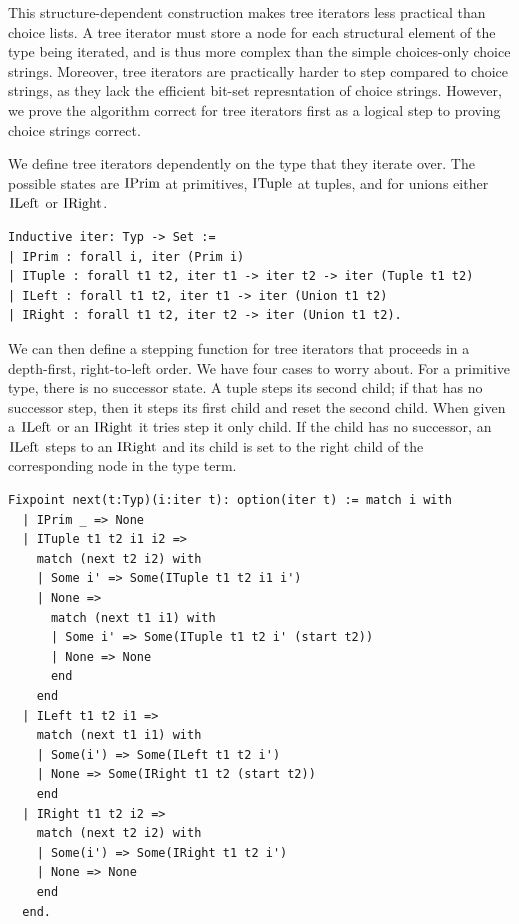 \documentclass[a4paper,english]{lipics-v2019}
\renewcommand{\c}[1]{\ensuremath{\text{\lstinline{#1}}}\xspace}
\begin{document}
\noindent
This structure-dependent construction makes tree iterators less practical
than choice lists. A tree iterator must store a node for each structural
element of the type being iterated, and is thus more complex than the simple
choices-only choice strings. Moreover, tree iterators are practically harder
to step compared to choice strings, as they lack the efficient bit-set represntation
of choice strings. However, we prove the algorithm correct for tree iterators 
first as a logical step to proving choice strings correct.

We define tree iterators dependently on the type that they iterate over. The
possible states are \c{IPrim} at primitives, \c{ITuple} at tuples, and for
unions either \c{ILeft} or \c{IRight}.

\begin{lstlisting}
Inductive iter: Typ -> Set :=
| IPrim : forall i, iter (Prim i)
| ITuple : forall t1 t2, iter t1 -> iter t2 -> iter (Tuple t1 t2)
| ILeft : forall t1 t2, iter t1 -> iter (Union t1 t2)
| IRight : forall t1 t2, iter t2 -> iter (Union t1 t2).
\end{lstlisting}

We can then define a stepping function for tree iterators that proceeds in a
depth-first, right-to-left order.  We have four cases to worry about. For a
primitive type, there is no successor state. A tuple steps its second child;
if that has no successor step, then it steps its first child and reset the
second child. When given a \c{ILeft} or an \c{IRight} it tries step it only
child. If the child has no successor, an \c{ILeft} steps to an \c{IRight}
and its child is set to the right child of the corresponding node in the
type term.

\begin{lstlisting}
Fixpoint next(t:Typ)(i:iter t): option(iter t) := match i with
  | IPrim _ => None
  | ITuple t1 t2 i1 i2 =>
    match (next t2 i2) with
    | Some i' => Some(ITuple t1 t2 i1 i')
    | None =>
      match (next t1 i1) with
      | Some i' => Some(ITuple t1 t2 i' (start t2))
      | None => None
      end
    end
  | ILeft t1 t2 i1 =>
    match (next t1 i1) with
    | Some(i') => Some(ILeft t1 t2 i')
    | None => Some(IRight t1 t2 (start t2))
    end
  | IRight t1 t2 i2 => 
    match (next t2 i2) with
    | Some(i') => Some(IRight t1 t2 i')
    | None => None
    end
  end.
\end{lstlisting}
\end{document}
